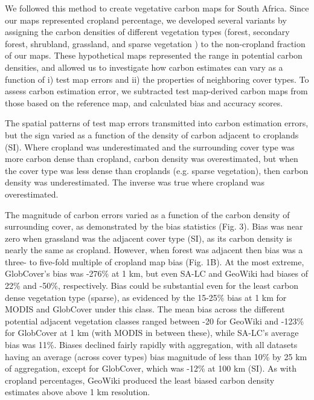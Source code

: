 \documentclass{pnastwo}
\begin{document}
\begin{article}
We followed this method to create vegetative carbon maps for South Africa. Since our maps represented cropland percentage, we developed several variants by assigning the carbon densities of different vegetation types (forest, secondary forest, shrubland, grassland, and sparse vegetation \cite{ruesch_new_2008}) to the non-cropland fraction of our maps. These hypothetical maps represented the range in potential carbon densities, and allowed us to investigate how carbon estimates can vary as a function of i) test map errors and ii) the properties of neighboring cover types. To assess carbon estimation error, we subtracted test map-derived carbon maps from those based on the reference map, and calculated bias and accuracy scores. 

The spatial patterns of test map errors transmitted into carbon estimation errors, but the sign varied as a function of the density of carbon adjacent to croplands (SI). Where cropland was underestimated and the surrounding cover type was more carbon dense than cropland, carbon density was overestimated, but when the cover type was less dense than croplands (e.g. sparse vegetation), then carbon density was underestimated. The inverse was true where cropland was overestimated. 

The magnitude of carbon errors varied as a function of the carbon density of surrounding cover, as demonstrated by the bias statistics (Fig. 3). Bias was near zero when grassland was the adjacent cover type (SI), as its carbon density is nearly the same as cropland. However, when forest was adjacent then bias was a three- to five-fold multiple of cropland map bias (Fig. 1B). At the most extreme, GlobCover's bias was -276\% at 1 km, but even SA-LC and GeoWiki had biases of 22\% and -50\%, respectively. Bias could be substantial even for the least carbon dense vegetation type (sparse), as evidenced by the 15-25\% bias at 1 km for MODIS and GlobCover under this class.  The mean bias across the different potential adjacent vegetation classes ranged between -20 for GeoWiki and -123\% for GlobCover at 1 km (with MODIS in between these), while SA-LC's average bias was 11\%.  Biases declined fairly rapidly with aggregation, with all datasets having an average (across cover types) bias magnitude of less than 10\% by 25 km of aggregation, except for GlobCover, which was -12\% at 100 km (SI).  As with cropland percentages, GeoWiki produced the least biased carbon density estimates above above 1 km resolution. 


\end{article}
\end{document}

